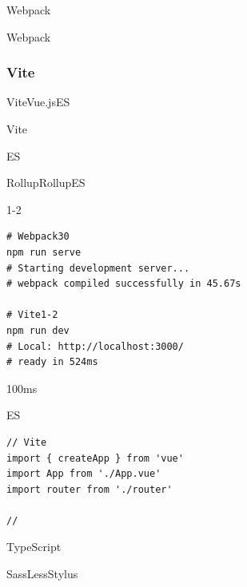 \important{}

\important{}


\important{}Webpack

\important{}Webpack

\important{}

\hypertarget{vite}{%
\subsubsection{Vite}\label{vite}}

ViteVue.jsES


Vite\important{}

\important{}ES

\important{}RollupRollupES


\important{}1-2

\begin{lstlisting}[style=terminal]
# Webpack30
npm run serve
# Starting development server...
# webpack compiled successfully in 45.67s

# Vite1-2
npm run dev
# Local: http://localhost:3000/
# ready in 524ms
\end{lstlisting}

\important{}100ms

ES

\begin{lstlisting}[style=javascript]
// Vite
import { createApp } from 'vue'
import App from './App.vue'
import router from './router'

// 
\end{lstlisting}

TypeScript

SassLessStylus


